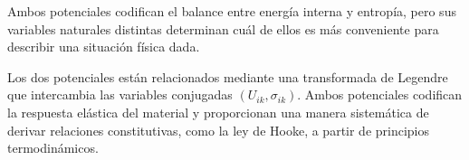 Ambos potenciales codifican el balance entre energía interna y entropía, pero sus variables naturales distintas determinan cuál de ellos es más conveniente para describir una situación física dada.

Los dos potenciales están relacionados mediante una transformada de Legendre que intercambia las variables conjugadas $(U_{ik},\sigma_{ik})$. Ambos potenciales codifican la respuesta elástica del material y proporcionan una manera sistemática de derivar relaciones constitutivas, como la ley de Hooke, a partir de principios termodinámicos.
